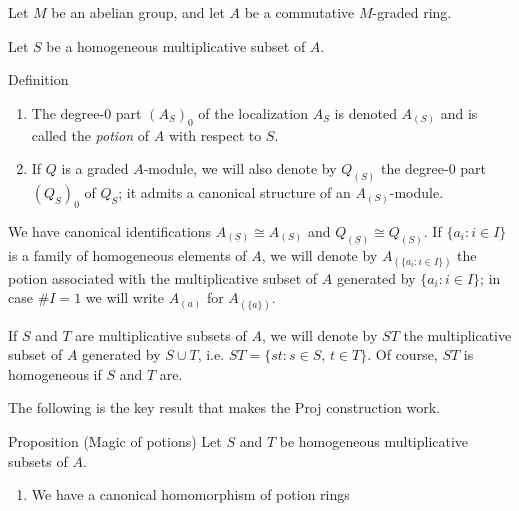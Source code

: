 \documentclass[9pt]{beamer}
\begin{document}
\begin{frame}


Let $M$ be an abelian group, and let $A$ be a commutative $M$-graded ring.

Let $S$ be a homogeneous multiplicative subset of $A$. \begin{block}{Definition}
\begin{enumerate}
\item
The degree-$0$ part $(A_S)_0$ of the localization $A_{S}$ is denoted $A_{(S)}$ and is called the \emph{potion} of $A$ with respect to $S$. 
\item
If $Q$ is a graded $A$-module, we will also denote by $Q_{(S)}$ the degree-$0$ part $(Q_S)_0$ of $Q_S$; it admits a canonical structure of an $A_{(S)}$-module.
\end{enumerate}
\end{block}


We have canonical identifications
$A_{(\underline{S})} \cong A_{(S)}$ and $Q_{(\underline{S})} \cong Q_{(S)}$.
If  $\{a_i : i \in I \}$ is a family of homogeneous elements of $A$, we will denote by
$A_{(\{a_i : i \in I \})}$
the potion associated with the multiplicative subset of $A$ generated by $\{a_i : i \in I \}$; in case $\#I=1$ we will write $A_{(a)}$ for $A_{(\{a\})}$.

If $S$ and $T$ are multiplicative subsets of $A$, we will denote by $ST$ the multiplicative subset of $A$ generated by $S \cup T$, i.e. $ST = \{st : s \in S, \, t \in T \}$. Of course, $ST$ is homogeneous if $S$ and $T$ are.\end{frame}\begin{frame}
The following is the key result that makes the Proj construction work.

\begin{block}{Proposition (Magic of potions)}
\label{prop:magical} 
Let $S$ and $T$ be homogeneous multiplicative subsets of $A$. 
\begin{enumerate}
\item 
\label{it:magic-1}
We have a canonical homomorphism of potion rings 


\end{enumerate}
\end{block}
\end{frame}
\end{document}
